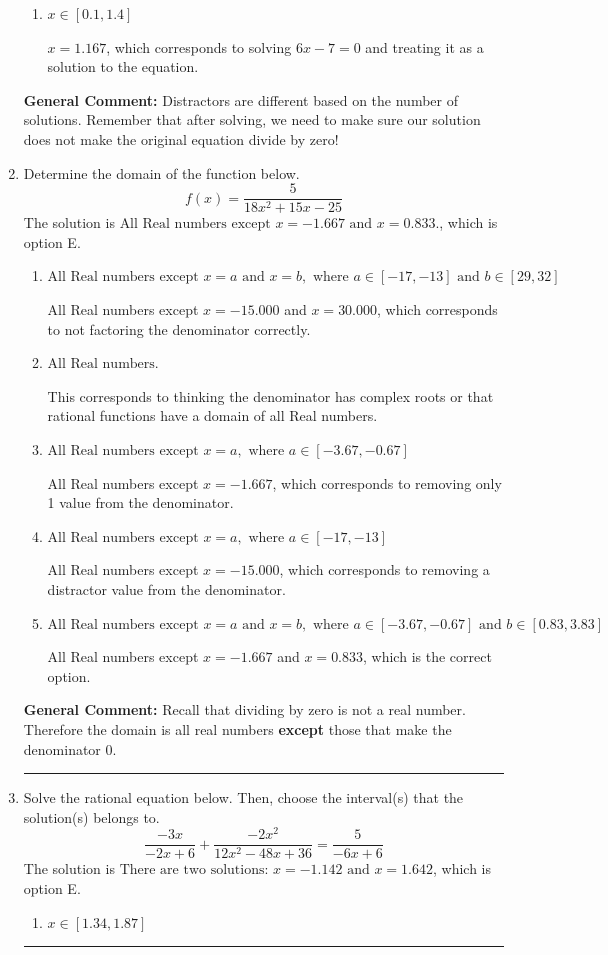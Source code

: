 \documentclass{extbook}[14pt]
\newcommand{\litem}[1]{\item #1

\rule{\textwidth}{0.4pt}}
\begin{document}
\begin{enumerate}
{\begin{enumerate}[label=\Alph*.]
$x = -1.500$, which corresponds to solving $4x + 6 = 0$ and treating it as a solution to the equation.
\item \( x \in [0.1,1.4] \)

$x = 1.167$, which corresponds to solving $6x -7 = 0$ and treating it as a solution to the equation.
\end{enumerate}

\textbf{General Comment:} Distractors are different based on the number of solutions. Remember that after solving, we need to make sure our solution does not make the original equation divide by zero!
}
\litem{
Determine the domain of the function below.
\[ f(x) = \frac{5}{18x^{2} +15 x -25} \]The solution is \( \text{All Real numbers except } x = -1.667 \text{ and } x = 0.833. \), which is option E.\begin{enumerate}[label=\Alph*.]
\item \( \text{All Real numbers except } x = a \text{ and } x = b, \text{ where } a \in [-17, -13] \text{ and } b \in [29, 32] \)

All Real numbers except $x = -15.000$ and $x = 30.000$, which corresponds to not factoring the denominator correctly.
\item \( \text{All Real numbers.} \)

This corresponds to thinking the denominator has complex roots or that rational functions have a domain of all Real numbers.
\item \( \text{All Real numbers except } x = a, \text{ where } a \in [-3.67, -0.67] \)

All Real numbers except $x = -1.667$, which corresponds to removing only 1 value from the denominator.
\item \( \text{All Real numbers except } x = a, \text{ where } a \in [-17, -13] \)

All Real numbers except $x = -15.000$, which corresponds to removing a distractor value from the denominator.
\item \( \text{All Real numbers except } x = a \text{ and } x = b, \text{ where } a \in [-3.67, -0.67] \text{ and } b \in [0.83, 3.83] \)

All Real numbers except $x = -1.667$ and $x = 0.833$, which is the correct option.
\end{enumerate}

\textbf{General Comment:} Recall that dividing by zero is not a real number. Therefore the domain is all real numbers \textbf{except} those that make the denominator 0.
}
\litem{
Solve the rational equation below. Then, choose the interval(s) that the solution(s) belongs to.
\[ \frac{-3x}{-2x + 6} + \frac{-2x^{2}}{12x^{2} -48 x + 36} = \frac{5}{-6x + 6} \]The solution is \( \text{There are two solutions: } x = -1.142 \text{ and } x = 1.642 \), which is option E.\begin{enumerate}[label=\Alph*.]
\item \( x \in [1.34,1.87] \)



\end{enumerate}}
\end{enumerate}
\end{document}
